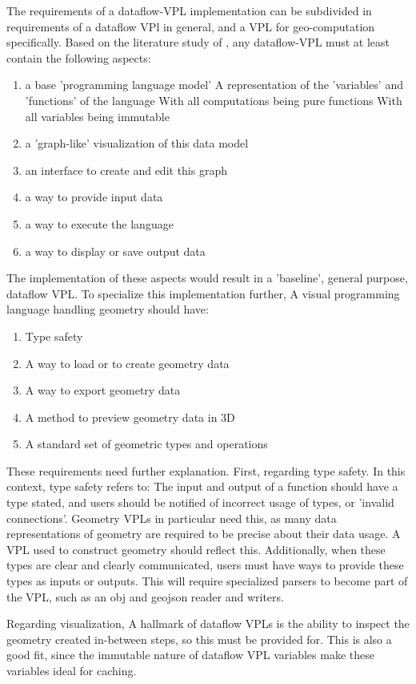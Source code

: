 The requirements of a dataflow-VPL implementation can be subdivided in requirements of a dataflow VPl in general, and a VPL for geo-computation specifically.
Based on the literature study of , any dataflow-VPL must at least contain the following aspects: 
\begin{enumerate}[-]
  \item a base 'programming language model'
  \subitem A representation of the 'variables' and 'functions' of the language
  \subitem With all computations being pure functions
  \subitem With all variables being immutable
  \item a 'graph-like' visualization of this data model
  \item an interface to create and edit this graph 
  \item a way to provide input data 
  \item a way to execute the language
  \item a way to display or save output data
\end{enumerate}
The implementation of these aspects would result in a 'baseline', general purpose, dataflow VPL. 
To specialize this implementation further, A visual programming language handling geometry should have:
\begin{enumerate}[-]
  \item Type safety 
  \item A way to load or to create geometry data 
  \item A way to export geometry data
  \item A method to preview geometry data in 3D
  \item A standard set of geometric types and operations
\end{enumerate}
These requirements need further explanation.
First, regarding type safety.
In this context, type safety refers to: 
The input and output of a function should have a type stated, and users should be notified of incorrect usage of types, or 'invalid connections'.
Geometry VPLs in particular need this, as many data representations of geometry are required to be precise about their data usage.
A VPL used to construct geometry should reflect this.
Additionally, when these types are clear and clearly communicated, users must have ways to provide these types as inputs or outputs. 
This will require specialized parsers to become part of the VPL, such as an obj and geojson reader and writers. 

Regarding visualization, A hallmark of dataflow VPLs is the ability to inspect the geometry created in-between steps, so this must be provided for.
This is also a good fit, since the immutable nature of dataflow VPL variables make these variables ideal for caching. 

